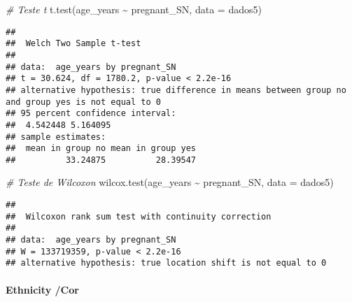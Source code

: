 \documentclass[
]{article}
\newenvironment{Shaded}{\begin{snugshade}}{\end{snugshade}}
\newcommand{\AttributeTok}[1]{\textcolor[rgb]{0.77,0.63,0.00}{#1}}
\newcommand{\CommentTok}[1]{\textcolor[rgb]{0.56,0.35,0.01}{\textit{#1}}}
\newcommand{\ConstantTok}[1]{\textcolor[rgb]{0.00,0.00,0.00}{#1}}
\newcommand{\DecValTok}[1]{\textcolor[rgb]{0.00,0.00,0.81}{#1}}
\newcommand{\FunctionTok}[1]{\textcolor[rgb]{0.00,0.00,0.00}{#1}}
\newcommand{\NormalTok}[1]{#1}
\newcommand{\SpecialCharTok}[1]{\textcolor[rgb]{0.00,0.00,0.00}{#1}}
\newcommand{\StringTok}[1]{\textcolor[rgb]{0.31,0.60,0.02}{#1}}
\begin{document}
\begin{Shaded}
\begin{Highlighting}[]
\CommentTok{\# Teste t}
\FunctionTok{t.test}\NormalTok{(age\_years }\SpecialCharTok{\textasciitilde{}}\NormalTok{ pregnant\_SN, }\AttributeTok{data =}\NormalTok{ dados5)}
\end{Highlighting}
\end{Shaded}

\begin{verbatim}
## 
##  Welch Two Sample t-test
## 
## data:  age_years by pregnant_SN
## t = 30.624, df = 1780.2, p-value < 2.2e-16
## alternative hypothesis: true difference in means between group no and group yes is not equal to 0
## 95 percent confidence interval:
##  4.542448 5.164095
## sample estimates:
##  mean in group no mean in group yes 
##          33.24875          28.39547
\end{verbatim}

\begin{Shaded}
\begin{Highlighting}[]
\CommentTok{\# Teste de Wilcoxon}
\FunctionTok{wilcox.test}\NormalTok{(age\_years }\SpecialCharTok{\textasciitilde{}}\NormalTok{ pregnant\_SN, }\AttributeTok{data =}\NormalTok{ dados5)}
\end{Highlighting}
\end{Shaded}

\begin{verbatim}
## 
##  Wilcoxon rank sum test with continuity correction
## 
## data:  age_years by pregnant_SN
## W = 133719359, p-value < 2.2e-16
## alternative hypothesis: true location shift is not equal to 0
\end{verbatim}

\hypertarget{ethnicity-cor}{%
\paragraph{\texorpdfstring{{Ethnicity /Cor
}}{Ethnicity /Cor }}\label{ethnicity-cor}}

\begin{Shaded}
\end{Shaded}
\end{document}
